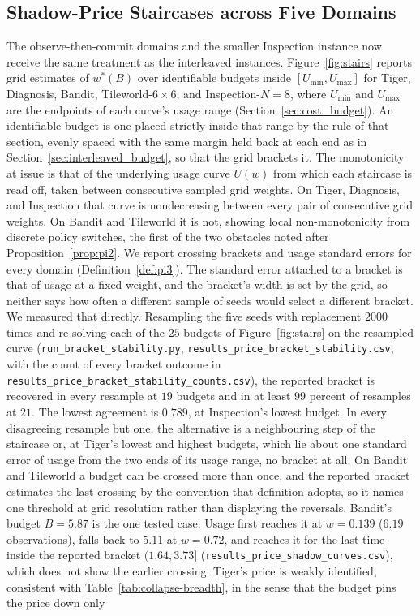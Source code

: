 \subsection{Shadow-Price Staircases across Five Domains}
\label{sec:stairs}

The observe-then-commit domains and the smaller Inspection instance now receive the same treatment as the interleaved instances. Figure~\ref{fig:stairs} reports grid estimates of $w^*(B)$ over identifiable budgets inside $[U_{\min}, U_{\max}]$ for Tiger, Diagnosis, Bandit, Tileworld-$6{\times}6$, and Inspection-$N{=}8$, where $U_{\min}$ and $U_{\max}$ are the endpoints of each curve's usage range (Section~\ref{sec:cost_budget}). An identifiable budget is one placed strictly inside that range by the rule of that section, evenly spaced with the same margin held back at each end as in Section~\ref{sec:interleaved_budget}, so that the grid brackets it. The monotonicity at issue is that of the underlying usage curve $U(w)$ from which each staircase is read off, taken between consecutive sampled grid weights. On Tiger, Diagnosis, and Inspection that curve is nondecreasing between every pair of consecutive grid weights. On Bandit and Tileworld it is not, showing local non-monotonicity from discrete policy switches, the first of the two obstacles noted after Proposition~\ref{prop:pi2}. We report crossing brackets and usage standard errors for every domain (Definition~\ref{def:pi3}). The standard error attached to a bracket is that of usage at a fixed weight, and the bracket's width is set by the grid, so neither says how often a different sample of seeds would select a different bracket. We measured that directly. Resampling the five seeds with replacement $2000$ times and re-solving each of the $25$ budgets of Figure~\ref{fig:stairs} on the resampled curve (\texttt{run\_\allowbreak bracket\_\allowbreak stability.py}, \texttt{results\_\allowbreak price\_\allowbreak bracket\_\allowbreak stability.csv}, with the count of every bracket outcome in \texttt{results\_\allowbreak price\_\allowbreak bracket\_\allowbreak stability\_\allowbreak counts.csv}), the reported bracket is recovered in every resample at $19$ budgets and in at least $99$ percent of resamples at $21$. The lowest agreement is $0.789$, at Inspection's lowest budget. In every disagreeing resample but one, the alternative is a neighbouring step of the staircase or, at Tiger's lowest and highest budgets, which lie about one standard error of usage from the two ends of its usage range, no bracket at all. On Bandit and Tileworld a budget can be crossed more than once, and the reported bracket estimates the last crossing by the convention that definition adopts, so it names one threshold at grid resolution rather than displaying the reversals. Bandit's budget $B{=}5.87$ is the one tested case. Usage first reaches it at $w{=}0.139$ ($6.19$ observations), falls back to $5.11$ at $w{=}0.72$, and reaches it for the last time inside the reported bracket $(1.64, 3.73]$ (\texttt{results\_\allowbreak price\_\allowbreak shadow\_\allowbreak curves.csv}), which does not show the earlier crossing. Tiger's price is weakly identified, consistent with Table~\ref{tab:collapse-breadth}, in the sense that the budget pins the price down only 